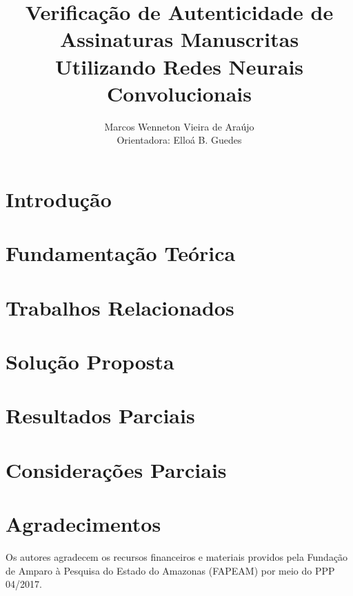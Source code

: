 \documentclass[12pt]{article}
\title{Verificação de Autenticidade de Assinaturas Manuscritas\\ Utilizando Redes Neurais Convolucionais}
\author{Marcos Wenneton Vieira de Araújo\\
Orientadora: Elloá B. Guedes}
\begin{document}
\maketitle
\pagestyle{plain} %

\section{Introdução} \label{sec:introducao}


\section{Fundamentação Teórica} \label{sec:fund-teor}


\section{Trabalhos Relacionados} \label{sec:trab-rel}


\section{Solução Proposta} \label{sec:sol-prop}


\section{Resultados Parciais} \label{sec:res-parc}


\section{Considerações Parciais} \label{sec:cons-parc}


\section*{Agradecimentos}
Os autores agradecem os recursos financeiros e materiais providos pela Fundação de Amparo à Pesquisa do Estado do Amazonas (FAPEAM) por meio do PPP 04/2017.



\end{document}
